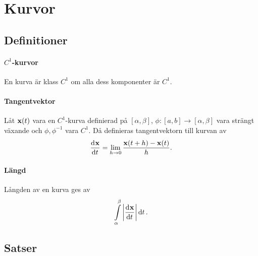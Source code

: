 \section{Kurvor}

\subsection{Definitioner}

\paragraph{$C^1$-kurvor}
En kurva är klass $C^1$ om alla dess komponenter är $C^1$.

\paragraph{Tangentvektor}
Låt $\vect{x}(t)$ vara en $C^1$-kurva definierad på $[\alpha, \beta]$, $\phi: [a, b]\to [\alpha, \beta]$ vara strängt växande och $\phi, \phi^{-1}$ vara $C^1$. Då definieras tangentvektorn till kurvan av
\begin{align*}
	\deval{\vect{x}}{t}{t} = \limit{h}{0}\frac{\vect{x}(t + h) - \vect{x}(t)}{h}.
\end{align*}

\paragraph{Längd}
Långden av en kurva ges av
\begin{align*}
	\int\limits_{\alpha}^{\beta}\abs{\deval{\vect{x}}{t}{t}}\dd{t}.
\end{align*}

\subsection{Satser}